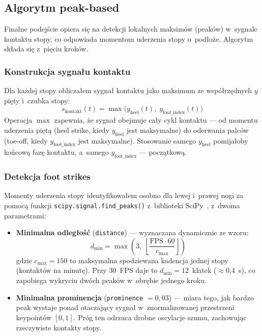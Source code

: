 \subsection{Algorytm peak-based}
\label{sec:labeling-peak-based}

Finalne podejście opiera się na detekcji lokalnych maksimów (peaków) w~sygnale kontaktu stopy, co odpowiada momentom uderzenia stopy o~podłoże. Algorytm składa się z~pięciu kroków.

\subsubsection{Konstrukcja sygnału kontaktu}

Dla każdej stopy obliczałem sygnał kontaktu jako maksimum ze współrzędnych $y$ pięty i~czubka stopy:
\[
s_{\text{kontakt}}(t) = \max\bigl(y_{\text{heel}}(t),\; y_{\text{foot\_index}}(t)\bigr)
\]
Operacja $\max$ zapewnia, że sygnał obejmuje cały cykl kontaktu --- od momentu uderzenia piętą (heel strike, kiedy $y_{\text{heel}}$ jest maksymalne) do oderwania palców (toe-off, kiedy $y_{\text{foot\_index}}$ jest maksymalne). Stosowanie samego $y_{\text{heel}}$ pomijałoby końcową fazę kontaktu, a~samego $y_{\text{foot\_index}}$ --- początkową.
\newpage
\subsubsection{Detekcja foot strikes}

Momenty uderzenia stopy identyfikowałem osobno dla lewej i~prawej nogi za pomocą funkcji \texttt{scipy.signal.find\_peaks()} z~biblioteki SciPy~\cite{scipy}, z~dwoma parametrami:

\begin{itemize}
    \item \textbf{Minimalna odległość} (\texttt{distance}) --- wyznaczana dynamicznie ze wzoru:
    \[
    d_{\min} = \max\!\left(3,\;\left\lfloor \frac{\text{FPS} \cdot 60}{c_{\max}} \right\rfloor\right)
    \]
    gdzie $c_{\max} = 150$ to maksymalna spodziewana kadencja jednej stopy (kontaktów na minutę). Przy 30~FPS daje to $d_{\min} = 12$~klatek ($\approx$0{,}4~s), co zapobiega wykryciu dwóch peaków w~obrębie jednego kroku.
    \item \textbf{Minimalna prominencja} (\texttt{prominence} $= 0{,}03$) --- miara tego, jak bardzo peak wystaje ponad otaczający sygnał w~znormalizowanej przestrzeni keypointów $[0, 1]$. Próg ten odrzuca drobne oscylacje szumu, zachowując rzeczywiste kontakty stopy.
\end{itemize}


